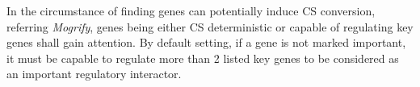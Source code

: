 \documentclass[fleqn,10pt]{wlscirep}
\begin{document}
In the circumstance of finding genes can potentially induce CS conversion, referring \emph{Mogrify}\cite{mogrify_2016}, genes being either CS deterministic or capable of regulating key genes shall gain attention.
By default setting, if a gene is not marked important, it must be capable to regulate more than 2 listed key genes to be considered as an important regulatory interactor.

%
\end{document}
